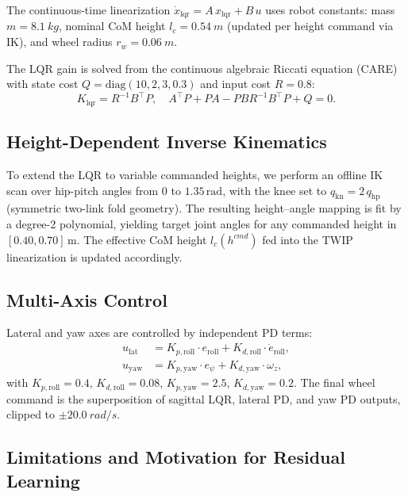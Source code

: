 \documentclass[conference]{IEEEtran}
\begin{document}
The continuous-time linearization
$\dot{x}_{\mathrm{lqr}} = A\,x_{\mathrm{lqr}} + B\,u$
uses robot constants:
mass $m = \SI{8.1}{kg}$,
nominal CoM height $l_c = \SI{0.54}{m}$ (updated per height command via IK),
and wheel radius $r_w = \SI{0.06}{m}$.

The LQR gain is solved from the continuous algebraic Riccati equation
(CARE) with state cost $Q = \mathrm{diag}(10, 2, 3, 0.3)$
and input cost $R = 0.8$:
\begin{equation}
K_{\mathrm{lqr}} = R^{-1} B^\top P,
\quad
A^\top P + P A - P B R^{-1} B^\top P + Q = 0.
\end{equation}

\subsection{Height-Dependent Inverse Kinematics}
To extend the LQR to variable commanded heights, we perform an offline IK
scan over hip-pitch angles from $0$ to $1.35\,\mathrm{rad}$, with the
knee set to $q_{\mathrm{kn}} = 2\,q_{\mathrm{hp}}$ (symmetric two-link
fold geometry).
The resulting height--angle mapping is fit by a degree-2 polynomial,
yielding target joint angles for any commanded height in $[0.40, 0.70]\,\mathrm{m}$.
The effective CoM height $l_c(h^{cmd})$ fed into the TWIP linearization
is updated accordingly.

\subsection{Multi-Axis Control}
Lateral and yaw axes are controlled by independent PD terms:
\begin{align}
u_{\mathrm{lat}} &=
K_{p,\mathrm{roll}} \cdot e_{\mathrm{roll}}
+ K_{d,\mathrm{roll}} \cdot \dot{e}_{\mathrm{roll}}, \\
u_{\mathrm{yaw}} &=
K_{p,\mathrm{yaw}} \cdot e_{\psi}
+ K_{d,\mathrm{yaw}} \cdot \omega_z,
\end{align}
with $K_{p,\mathrm{roll}} = 0.4$, $K_{d,\mathrm{roll}} = 0.08$,
$K_{p,\mathrm{yaw}} = 2.5$, $K_{d,\mathrm{yaw}} = 0.2$.
The final wheel command is the superposition of sagittal LQR,
lateral PD, and yaw PD outputs, clipped to $\pm\SI{20.0}{rad/s}$.

\subsection{Limitations and Motivation for Residual Learning}
\label{sec:prior_limitations}
\end{document}
